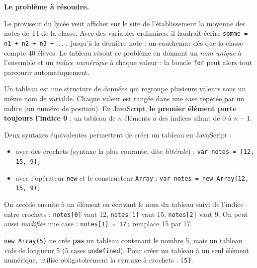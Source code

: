 \documentclass[11pt]{article}
\newcommand{\cle}[1]{{\popxbold\color{popdark}#1}}
\newcounter{popsec}
\newcounter{popsub}
\newcommand{\courssub}[1]{%
  \stepcounter{popsub}%
  \par\vspace{9pt}\noindent{\popxbold\fontsize{11.5}{13}\selectfont\color{popink}{\color{poporange}\thepopsec.\thepopsub}\hspace{6pt}#1}\par\nopagebreak\vspace{4pt}
}
\begin{document}
\courssub{Les tableaux en JavaScript}

\textbf{Le problème à résoudre.}\par
Le proviseur du lycée veut afficher sur le site de l'établissement la moyenne des notes de TI de la classe. Avec des variables ordinaires, il faudrait écrire \texttt{somme = n1 + n2 + n3 + ...} jusqu'à la dernière note : un cauchemar dès que la classe compte 40 élèves. Le tableau résout ce problème en donnant un \emph{nom unique} à l'ensemble et un \emph{indice numérique} à chaque valeur : la boucle \texttt{for} peut alors tout parcourir automatiquement.

\begin{definition}[Tableau]
Un \cle{tableau} est une structure de données qui regroupe plusieurs valeurs sous un même nom de variable. Chaque valeur est rangée dans une \cle{case} repérée par un \cle{indice} (un numéro de position). En JavaScript, \textbf{le premier élément porte toujours l'indice 0} : un tableau de $n$ éléments a des indices allant de $0$ à $n-1$.
\end{definition}

\begin{propriete}
Deux syntaxes équivalentes permettent de créer un tableau en JavaScript :
\begin{itemize}
  \item avec des \cle{crochets} (syntaxe la plus courante, dite \emph{littérale}) : \texttt{var notes = [12, 15, 9];}
  \item avec l'opérateur \texttt{new} et le constructeur \texttt{Array} : \texttt{var notes = new Array(12, 15, 9);}
\end{itemize}
On accède ensuite à un élément en écrivant le nom du tableau suivi de l'indice entre crochets : \texttt{notes[0]} vaut 12, \texttt{notes[1]} vaut 15, \texttt{notes[2]} vaut 9. On peut aussi \emph{modifier} une case : \texttt{notes[1] = 17;} remplace 15 par 17.
\end{propriete}

\begin{attention}
\texttt{new Array(5)} ne crée \textbf{pas} un tableau contenant le nombre 5, mais un tableau \emph{vide} de longueur 5 (5 cases \texttt{undefined}). Pour créer un tableau à un seul élément numérique, utilise obligatoirement la syntaxe à crochets : \texttt{[5]}.
\end{attention}
\end{document}
